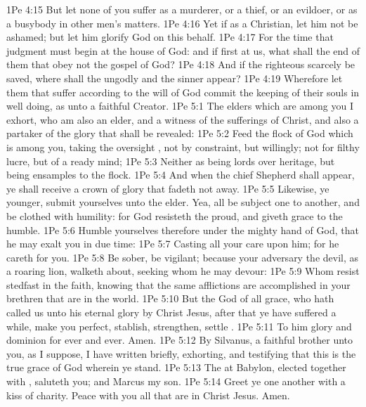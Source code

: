 \vs 1Pe 4:15 But let none of you suffer as a murderer, or  a thief, or  an evildoer, or as a busybody in other men's matters.
\vs 1Pe 4:16 Yet if  as a Christian, let him not be ashamed; but let him glorify God on this behalf.
\vs 1Pe 4:17 For the time  that judgment must begin at the house of God: and if  first  at us, what shall the end  of them that obey not the gospel of God?
\vs 1Pe 4:18 And if the righteous scarcely be saved, where shall the ungodly and the sinner appear?
\vs 1Pe 4:19 Wherefore let them that suffer according to the will of God commit the keeping of their souls  in well doing, as unto a faithful Creator.
\vs 1Pe 5:1 The elders which are among you I exhort, who am also an elder, and a witness of the sufferings of Christ, and also a partaker of the glory that shall be revealed:
\vs 1Pe 5:2 Feed the flock of God which is among you, taking the oversight , not by constraint, but willingly; not for filthy lucre, but of a ready mind;
\vs 1Pe 5:3 Neither as being lords over  heritage, but being ensamples to the flock.
\vs 1Pe 5:4 And when the chief Shepherd shall appear, ye shall receive a crown of glory that fadeth not away.
\vs 1Pe 5:5 Likewise, ye younger, submit yourselves unto the elder. Yea, all  be subject one to another, and be clothed with humility: for God resisteth the proud, and giveth grace to the humble.
\vs 1Pe 5:6 Humble yourselves therefore under the mighty hand of God, that he may exalt you in due time:
\vs 1Pe 5:7 Casting all your care upon him; for he careth for you.
\vs 1Pe 5:8 Be sober, be vigilant; because your adversary the devil, as a roaring lion, walketh about, seeking whom he may devour:
\vs 1Pe 5:9 Whom resist stedfast in the faith, knowing that the same afflictions are accomplished in your brethren that are in the world.
\vs 1Pe 5:10 But the God of all grace, who hath called us unto his eternal glory by Christ Jesus, after that ye have suffered a while, make you perfect, stablish, strengthen, settle .
\vs 1Pe 5:11 To him  glory and dominion for ever and ever. Amen.
\vs 1Pe 5:12 By Silvanus, a faithful brother unto you, as I suppose, I have written briefly, exhorting, and testifying that this is the true grace of God wherein ye stand.
\vs 1Pe 5:13 The  at Babylon, elected together with , saluteth you; and  Marcus my son.
\vs 1Pe 5:14 Greet ye one another with a kiss of charity. Peace  with you all that are in Christ Jesus. Amen.
